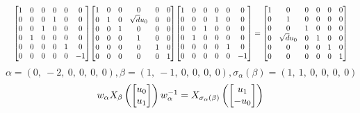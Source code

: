 \documentclass[11pt]{article}
\theoremstyle{definition}
\begin{document}
\[
\scaletoalign{\textwidth}{{\left[\begin{matrix}1 & 0 & 0 & 0 & 0 & 0\\0 & 0 & 0 & 1 & 0 & 0\\0 & 0 & 1 & 0 & 0 & 0\\0 & 1 & 0 & 0 & 0 & 0\\0 & 0 & 0 & 0 & 1 & 0\\0 & 0 & 0 & 0 & 0 & -1\end{matrix}\right]} {\left[\begin{matrix}1 & 0 & 0 & 0 & 0 & 0\\0 & 1 & 0 & \sqrt{d} u_{0} & 0 & 0\\0 & 0 & 1 & 0 & 0 & 0\\0 & 0 & 0 & 1 & 0 & 0\\0 & 0 & 0 & 0 & 1 & 0\\0 & 0 & 0 & 0 & 0 & 1\end{matrix}\right]} {\left[\begin{matrix}1 & 0 & 0 & 0 & 0 & 0\\0 & 0 & 0 & 1 & 0 & 0\\0 & 0 & 1 & 0 & 0 & 0\\0 & 1 & 0 & 0 & 0 & 0\\0 & 0 & 0 & 0 & 1 & 0\\0 & 0 & 0 & 0 & 0 & -1\end{matrix}\right]} = {\left[\begin{matrix}1 & 0 & 0 & 0 & 0 & 0\\0 & 1 & 0 & 0 & 0 & 0\\0 & 0 & 1 & 0 & 0 & 0\\0 & \sqrt{d} u_{0} & 0 & 1 & 0 & 0\\0 & 0 & 0 & 0 & 1 & 0\\0 & 0 & 0 & 0 & 0 & 1\end{matrix}\right]}}
\]
\[
\alpha = \left( 0, \  -2, \  0, \  0, \  0, \  0\right), \beta = \left( 1, \  -1, \  0, \  0, \  0, \  0\right), \sigma_{\alpha}(\beta) = \left( 1, \  1, \  0, \  0, \  0, \  0\right)
\]
\[
\scaletoalign{\textwidth}{w_{\alpha} X_{\beta}\left(\left[\begin{matrix}u_{0}\\u_{1}\end{matrix}\right]\right) w_{\alpha}^{-1} = X_{\sigma_{\alpha}\left(\beta\right)}\left(\left[\begin{matrix}u_{1}\\- u_{0}\end{matrix}\right]\right)}
\]
\end{document}
